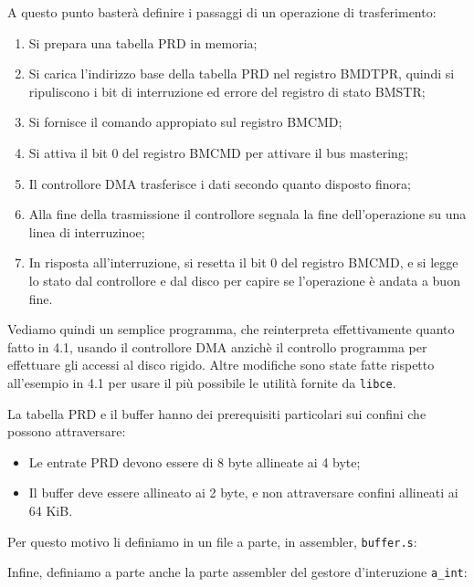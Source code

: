 \documentclass[a4paper,11pt]{article}
\begin{document}
A questo punto basterà definire i passaggi di un operazione di trasferimento:
\begin{enumerate}
	\item Si prepara una tabella PRD in memoria;
	\item Si carica l'indirizzo base della tabella PRD nel registro BMDTPR, quindi si ripuliscono i bit di interruzione ed errore del registro di stato BMSTR;
	\item Si fornisce il comando appropiato sul registro BMCMD;
	\item Si attiva il bit 0 del registro BMCMD per attivare il bus mastering;
	\item Il controllore DMA trasferisce i dati secondo quanto disposto finora;
	\item Alla fine della trasmissione il controllore segnala la fine dell'operazione su una linea di interruzinoe;
	\item In risposta all'interruzione, si resetta il bit 0 del registro BMCMD, e si legge lo stato dal controllore e dal disco per capire se l'operazione è andata a buon fine.
\end{enumerate}

\par\smallskip

Vediamo quindi un semplice programma, che reinterpreta effettivamente quanto fatto in 4.1, usando il controllore DMA anzichè il controllo programma per effettuare gli accessi al disco rigido.
Altre modifiche sono state fatte rispetto all'esempio in 4.1 per usare il più possibile le utilità fornite da \lstinline|libce|.
\lstset{language=C++,style=codestyle}


La tabella PRD e il buffer hanno dei prerequisiti particolari sui confini che possono attraversare:
\begin{itemize}
	\item Le entrate PRD devono essere di 8 byte allineate ai 4 byte;
	\item Il buffer deve essere allineato ai 2 byte, e non attraversare confini allineati ai 64 KiB.
\end{itemize}
Per questo motivo li definiamo in un file a parte, in assembler, \lstinline|buffer.s|:
\lstset{language=assembler,style=codestyle}


Infine, definiamo a parte anche la parte assembler del gestore d'interuzione \lstinline|a_int|:

\end{document}
